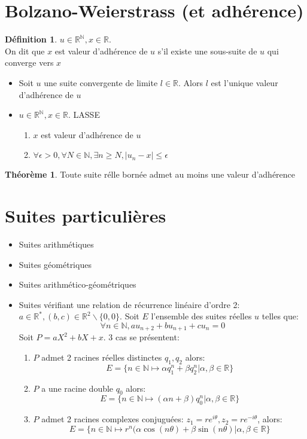 \documentclass[fleqn]{article}
\theoremstyle{definition} \newtheorem*{defi}{D\'efinition}
\theoremstyle{definition} \newtheorem*{theo}{Th\'eor\`eme}
\begin{document}
\section{Bolzano-Weierstrass (et adh\'erence)}
\begin{defi}
	$u \in \mathbb{R}^\mathbb{N}, x \in \mathbb{R}$. \\
	On dit que $x$ est valeur d'adh\'erence de $u$ s'il existe une sous-suite de $u$ qui converge vers $x$
\end{defi}
\begin{itemize}
	\item Soit $u$ une suite convergente de limite $l \in \mathbb{R}$. Alors $l$ est l'unique valeur d'adh\'erence de $u$
	\item $u \in \mathbb{R}^\mathbb{N}, x \in \mathbb{R}$. LASSE
	\begin{enumerate}
		\item $x$ est valeur d'adh\'erence de $u$
		\item $\forall \epsilon > 0, \forall N \in \mathbb{N}, \exists n \geq N, |u_n - x| \leq \epsilon$
	\end{enumerate}
\end{itemize}

\begin{theo}
	Toute suite r\'elle born\'ee admet au moins une valeur d'adh\'erence
\end{theo}

\section{Suites particuli\`eres}
\begin{itemize}
	\item Suites arithm\'etiques
	\item Suites g\'eom\'etriques
	\item Suites arithm\'etico-g\'eom\'etriques
	\item Suites v\'erifiant une relation de r\'ecurrence lin\'eaire d'ordre 2: \\
		$a \in \mathbb{R}^*, (b,c) \in \mathbb{R}^2\backslash\{0,0\}$. Soit $E$ l'ensemble des suites r\'eelles $u$ telles que:
		\[\forall n \in \mathbb{N}, au_{n+2} + bu_{n+1} + cu_n = 0\]
		Soit $P = aX^2 + bX + x$. 3 cas se pr\'esentent:
		\begin{enumerate}
			\item $P$ admet 2 racines r\'eelles distinctes $q_1, q_2$ alors:
				\[E = \{n \in \mathbb{N} \mapsto \alpha q_1^n + \beta q_2^n | \alpha, \beta \in \mathbb{R}\}\]
			\item $P$ a une racine double $q_0$ alors:
				\[E = \{n \in \mathbb{N} \mapsto (\alpha n + \beta) q_0^n | \alpha, \beta \in \mathbb{R}\}\]
			\item $P$ admet 2 racines complexes conjugu\'ees: $z_1 = re^{i\theta}, z_2 = re^{-i\theta}$, alors:
				\[E = \{n \in \mathbb{N} \mapsto r^n(\alpha \cos(n\theta) + \beta \sin(n\theta) | \alpha, \beta \in \mathbb{R}\}\]
		\end{enumerate}
\end{itemize}
\end{document}
